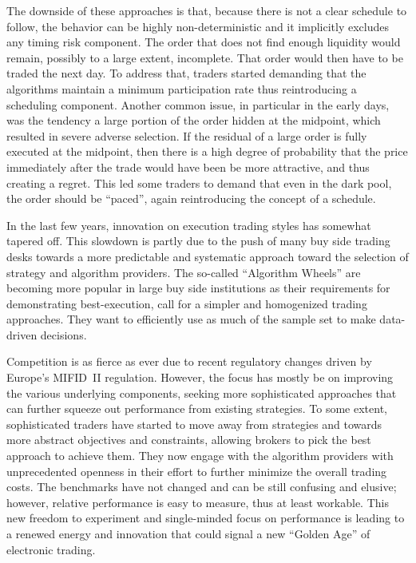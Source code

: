 The downside of these approaches is that, because there is not a clear schedule to follow, the behavior can be highly non-deterministic and it implicitly excludes any timing risk component. The order that does not find enough liquidity would remain, possibly to a large extent, incomplete. That order would then have to be traded the next day. To address that, traders started demanding that the algorithms maintain a minimum participation rate thus reintroducing a scheduling component. Another common issue, in particular in the early days, was the tendency a large portion of the order hidden at the midpoint, which resulted in severe adverse selection. If the residual of a large order is fully executed at the midpoint, then there is a high degree of probability that the price immediately after the trade would have been be more attractive, and thus creating a regret. This led some traders to demand that even in the dark pool, the order should be ``paced'', again reintroducing the concept of a schedule.


In the last few years, innovation on execution trading styles has somewhat tapered off. This slowdown is partly due to the push of many buy side trading desks towards a more predictable and systematic approach toward the selection of strategy and algorithm providers. The so-called ``Algorithm Wheels'' are becoming more popular in large buy side institutions as their requirements for demonstrating best-execution, call for a simpler and homogenized trading approaches. They want to efficiently use as much of the sample set to make data-driven decisions. 


Competition is as fierce as ever due to recent regulatory changes driven by Europe's MIFID~II regulation. However, the focus has mostly be on improving the various underlying components, seeking more sophisticated approaches that can further squeeze out performance from existing strategies. To some extent, sophisticated traders have started to move away from strategies and towards more abstract objectives and constraints, allowing brokers to pick the best approach to achieve them. They now engage with the algorithm providers with unprecedented openness in their effort to further minimize the overall trading costs. The benchmarks have not changed and can be still confusing and elusive; however, relative performance is easy to measure, thus at least workable. This new freedom to experiment and single-minded focus on performance is leading to a renewed energy and innovation that could signal a new ``Golden Age'' of electronic trading.



